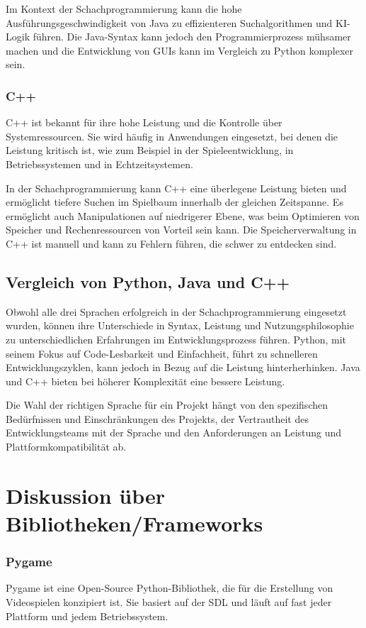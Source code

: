 Im Kontext der Schachprogrammierung kann die hohe Ausführungsgeschwindigkeit von Java zu effizienteren Suchalgorithmen und KI-Logik führen. 
Die Java-Syntax kann jedoch den Programmierprozess mühsamer machen und die Entwicklung von GUIs kann im Vergleich zu Python komplexer sein.

\subsubsection{C++}
C++ ist bekannt für ihre hohe Leistung und die Kontrolle über Systemressourcen. 
Sie wird häufig in Anwendungen eingesetzt, bei denen die Leistung kritisch ist, wie zum Beispiel in der Spieleentwicklung, 
in Betriebssystemen und in Echtzeitsystemen.

In der Schachprogrammierung kann C++ eine überlegene Leistung bieten und ermöglicht tiefere Suchen im Spielbaum innerhalb der gleichen Zeitspanne. 
Es ermöglicht auch Manipulationen auf niedrigerer Ebene, was beim Optimieren von Speicher und Rechenressourcen von Vorteil sein kann.
Die Speicherverwaltung in C++ ist manuell und kann zu Fehlern führen, die schwer zu entdecken sind.

\subsection{Vergleich von Python, Java und C++}
Obwohl alle drei Sprachen erfolgreich in der Schachprogrammierung eingesetzt wurden, können ihre Unterschiede in Syntax, 
Leistung und Nutzungsphilosophie zu unterschiedlichen Erfahrungen im Entwicklungsprozess führen. 
Python, mit seinem Fokus auf Code-Lesbarkeit und Einfachheit, führt zu schnelleren Entwicklungszyklen, 
kann jedoch in Bezug auf die Leistung hinterherhinken. Java und C++ bieten bei höherer Komplexität eine bessere Leistung.

Die Wahl der richtigen Sprache für ein Projekt hängt von den spezifischen Bedürfnissen und Einschränkungen des Projekts, 
der Vertrautheit des Entwicklungsteams mit der Sprache und den Anforderungen an Leistung und Plattformkompatibilität ab.

\section{Diskussion über Bibliotheken/Frameworks}
\subsubsection{Pygame}
Pygame ist eine Open-Source Python-Bibliothek, die für die Erstellung von Videospielen konzipiert ist. 
Sie basiert auf der \ac{SDL} und läuft auf fast jeder Plattform und jedem Betriebssystem.

